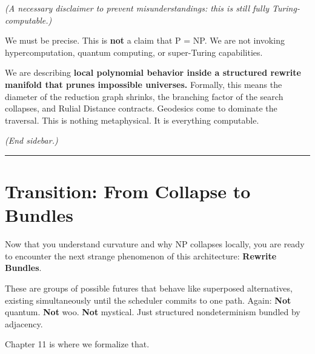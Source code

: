 \textit{(A necessary disclaimer to prevent misunderstandings: this is still fully Turing-computable.)}

We must be precise. This is \textbf{not} a claim that P = NP. We are not invoking hypercomputation, quantum computing, or super-Turing capabilities.

We are describing \textbf{local polynomial behavior inside a structured rewrite manifold that prunes impossible universes.} Formally, this means the diameter of the reduction graph shrinks, the branching factor of the search collapses, and Rulial Distance contracts. Geodesics come to dominate the traversal. This is nothing metaphysical. It is everything computable.

\textit{(End sidebar.)}

\begin{center}\rule{0.5\linewidth}{0.5pt}\end{center}

\section{\texorpdfstring{\textbf{Transition: From Collapse to Bundles}}{10.10 --- Transition: From Collapse to Bundles}}

Now that you understand curvature and why NP collapses locally, you are ready to encounter the next strange phenomenon of this architecture: \textbf{Rewrite Bundles}.

These are groups of possible futures that behave like superposed alternatives, existing simultaneously until the scheduler commits to one path. Again: \textbf{Not} quantum. \textbf{Not} woo. \textbf{Not} mystical. Just structured nondeterminism bundled by adjacency.

Chapter 11 is where we formalize that.

